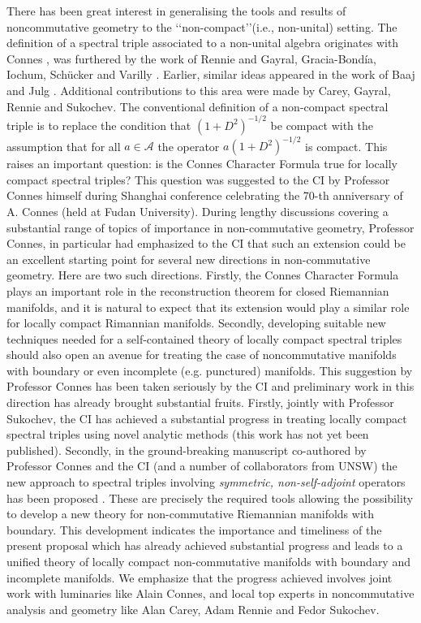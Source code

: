 \documentclass[12pt]{article}
\begin{document}
There has been great interest in generalising the tools and results of noncommutative geometry to the \lq\lq non-compact\rq\rq (i.e., non-unital) setting. The definition of a spectral triple associated to a non-unital algebra originates with Connes \cite{Connes-reality}, was furthered by the work of Rennie \cite{Rennie}     and Gayral, Gracia-Bond\'ia, Iochum, Sch\"ucker and Varilly \cite{gayral-moyal}. Earlier, similar ideas appeared in the work of Baaj and Julg \cite{Baaj-Julg}. Additional contributions to this area were made by Carey, Gayral, Rennie and Sukochev\cite{CGRS}. The conventional definition  of a non-compact spectral triple is to replace the condition that $(1+D^2)^{-1/2}$ be compact with the assumption that for all $a \in \mathcal{A}$ the operator $a(1+D^2)^{-1/2}$ is compact.
    This raises an important question: is the Connes Character Formula true for locally compact spectral triples? This question was suggested to the CI by Professor Connes himself during Shanghai conference celebrating the 70-th anniversary of A. Connes (held at Fudan University). During lengthy discussions covering a substantial range of topics of importance in non-commutative geometry, Professor Connes, in particular had emphasized to the CI that such an extension could be an excellent starting point for several new directions in non-commutative geometry. Here are two such directions. Firstly, the Connes Character Formula plays  an important role in the reconstruction theorem for closed Riemannian manifolds, and it is natural to expect that its extension would play a similar role for locally compact Rimannian manifolds. Secondly, developing suitable new techniques needed for a self-contained theory of locally compact spectral triples should also open an avenue for treating the case of noncommutative manifolds with boundary or even incomplete (e.g. punctured) manifolds. This suggestion by Professor Connes has been taken seriously by the CI and preliminary work in this direction has already brought substantial fruits. Firstly, jointly with Professor Sukochev, the CI has achieved a substantial progress in treating locally compact spectral triples using novel analytic methods (this work has not yet been published). Secondly, in the ground-breaking manuscript co-authored by Professor Connes and the CI (and a number of collaborators from UNSW) the new approach to spectral triples involving {\it symmetric, non-self-adjoint} operators has been proposed \cite{Connes_team_symmetric}. These are precisely the required tools allowing the possibility to develop a new theory for non-commutative Riemannian manifolds with boundary. This development indicates the importance and timeliness of the present proposal which has already achieved substantial progress and leads to a unified theory of locally compact non-commutative manifolds with boundary and incomplete manifolds. We emphasize that the progress achieved involves joint work with luminaries like Alain Connes, and local top experts in noncommutative analysis and geometry like Alan Carey, Adam Rennie and Fedor Sukochev.
    
\end{document}
